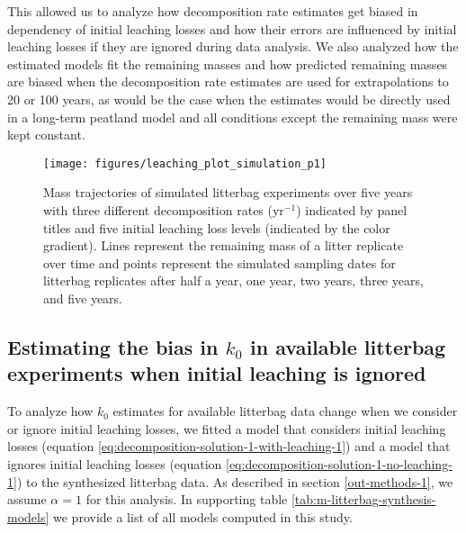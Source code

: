 \documentclass[bg, manuscript]{copernicus}
\begin{document}
This allowed us to analyze how decomposition rate estimates get biased in dependency of initial leaching losses and how their errors are influenced by initial leaching losses if they are ignored during data analysis. We also analyzed how the estimated models fit the remaining masses and how predicted remaining masses are biased when the decomposition rate estimates are used for extrapolations to 20 or 100 years, as would be the case when the estimates would be directly used in a long-term peatland model and all conditions except the remaining mass were kept constant.



\begin{figure}[H]

{\centering \texttt{[image: figures/leaching\_plot\_simulation\_p1]} 

}

\caption{Mass trajectories of simulated litterbag experiments over five years with three different decomposition rates (yr\(^{-1}\)) indicated by panel titles and five initial leaching loss levels (indicated by the color gradient). Lines represent the remaining mass of a litter replicate over time and points represent the simulated sampling dates for litterbag replicates after half a year, one year, two years, three years, and five years.}\label{fig:out-simulation-p1}
\end{figure}

\hypertarget{methods-bias-real-1}{%
\subsection{\texorpdfstring{Estimating the bias in \(k_0\) in available litterbag experiments when initial leaching is ignored}{Estimating the bias in k\_0 in available litterbag experiments when initial leaching is ignored}}\label{methods-bias-real-1}}

To analyze how \(k_0\) estimates for available litterbag data change when we consider or ignore initial leaching losses, we fitted a model that considers initial leaching losses (equation \eqref{eq:decomposition-solution-1-with-leaching-1}) and a model that ignores initial leaching losses (equation \eqref{eq:decomposition-solution-1-no-leaching-1}) to the synthesized litterbag data. As described in section \ref{out-methods-1}, we assume \(\alpha=1\) for this analysis. In supporting table \ref{tab:m-litterbag-synthesis-models} we provide a list of all models computed in this study.
\end{document}
